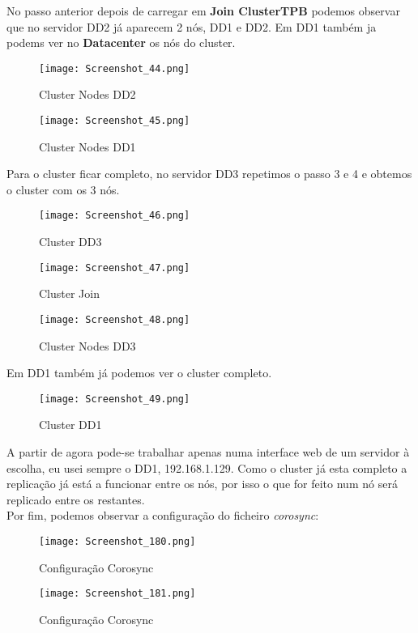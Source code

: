  No passo anterior depois de carregar em \textbf{Join ClusterTPB} podemos observar que no servidor DD2 já aparecem 2 nós, DD1 e DD2. Em DD1 também ja podems ver no \textbf{Datacenter} os nós do cluster.
\begin{figure}[H]
\center
\texttt{[image: Screenshot\_44.png]}
\caption{Cluster Nodes DD2}
\end{figure}

\begin{figure}[H]
\center
\texttt{[image: Screenshot\_45.png]}
\caption{Cluster Nodes DD1}
\end{figure}

Para o cluster ficar completo, no servidor DD3 repetimos o passo 3 e 4 e obtemos o cluster com os 3 nós.

\begin{figure}[H]
\center
\texttt{[image: Screenshot\_46.png]}
\caption{Cluster DD3}
\end{figure}

\begin{figure}[H]
\center
\texttt{[image: Screenshot\_47.png]}
\caption{Cluster Join}
\end{figure}

\begin{figure}[H]
\center
\texttt{[image: Screenshot\_48.png]}
\caption{Cluster Nodes DD3}
\end{figure}

\newpage
Em DD1 também já podemos ver o cluster completo.
\begin{figure}[H]
\center
\texttt{[image: Screenshot\_49.png]}
\caption{Cluster DD1}
\end{figure}

A partir de agora pode-se trabalhar apenas numa interface web de um servidor à escolha, eu usei sempre o DD1, 192.168.1.129. Como o cluster já esta completo a replicação já está a funcionar entre os nós, por isso o que for feito num nó será replicado entre os restantes.\\

Por fim, podemos observar a configuração do ficheiro \textit{corosync}:

\begin{figure}[H]
\center
\texttt{[image: Screenshot\_180.png]}
\caption{Configuração Corosync}
\end{figure}

\begin{figure}[H]
\center
\texttt{[image: Screenshot\_181.png]}
\caption{Configuração Corosync}
\end{figure}

